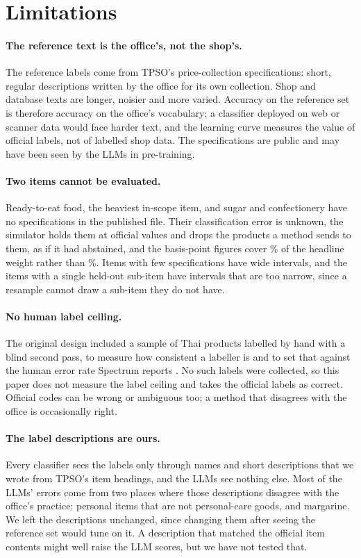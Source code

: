 \section{Limitations}\label{sec:limitations}

\paragraph{The reference text is the office's, not the shop's.} The reference labels come
from TPSO's price-collection specifications: short, regular descriptions written by the
office for its own collection. Shop and database texts are longer, noisier and more varied.
Accuracy on the reference set is therefore accuracy on the office's vocabulary; a classifier
deployed on web or scanner data would face harder text, and the learning curve measures the
value of official labels, not of labelled shop data. The specifications are public and may
have been seen by the LLMs in pre-training.

\paragraph{Two items cannot be evaluated.} Ready-to-eat food, the heaviest in-scope item,
and sugar and confectionery have no specifications in the published file. Their
classification error is unknown, the simulator holds them at official values and drops the
products a method sends to them, as if it had abstained, and the
basis-point figures cover \RefWeightEqual\% of the headline weight rather than
\InScopeWeightEqual\%. Items with few specifications have wide intervals, and the
\NRefItemsOneSubitem{} items with a single held-out sub-item have intervals that are too
narrow, since a resample cannot draw a sub-item they do not have.

\paragraph{No human label ceiling.} The original design included a sample of Thai products
labelled by hand with a blind second pass, to measure how consistent a labeller is and to
set that against the human error rate Spectrum reports
\citep[p.~15]{bis2026spectrum}. No such labels were collected, so this paper does not
measure the label ceiling and takes the official labels as correct. Official codes can be
wrong or ambiguous too; a method that disagrees with the office is occasionally right.

\paragraph{The label descriptions are ours.} Every classifier sees the labels only through
names and short descriptions that we wrote from TPSO's item headings, and the LLMs see
nothing else. Most of the LLMs' errors come from two places where those descriptions
disagree with the office's practice: personal items that are not personal-care goods, and
margarine. We left the descriptions unchanged, since changing them after seeing the
reference set would tune on it. A description that matched the official item contents might
well raise the LLM scores, but we have not tested that.


